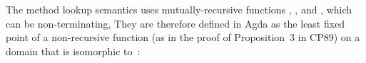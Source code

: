\begin{AgdaAlign}
The method lookup semantics uses mutually-recursive functions 
, , and ,
which can be non-terminating, 
They are therefore defined in Agda as the least fixed point
of a non-recursive function 
(as in the proof of Proposition~3 in CP89) on a domain 
that is isomorphic to~:
%
\begin{code}%
%
\>[2]\AgdaSpace{}%
\AgdaSymbol{=}%
\>[8]\AgdaSymbol{(}\AgdaSpace{}%
\AgdaSpace{}%
\AgdaSpace{}%
\AgdaSpace{}%
\AgdaSpace{}%
\AgdaSpace{}%
\AgdaSymbol{)}\AgdaSpace{}%
\<%
\\
%
\>[8]\AgdaSymbol{(}\AgdaSpace{}%
\AgdaSpace{}%
\AgdaSpace{}%
\AgdaSpace{}%
\AgdaSpace{}%
\AgdaSpace{}%
\AgdaSpace{}%
\AgdaSpace{}%
\AgdaSymbol{)}\AgdaSpace{}%
\<%
\\
%
\>[8]\AgdaSymbol{(}\AgdaSpace{}%
\AgdaSpace{}%
\AgdaSpace{}%
\AgdaSpace{}%
\AgdaSpace{}%
\AgdaSpace{}%
\AgdaSpace{}%
\AgdaSpace{}%
\AgdaSpace{}%
\AgdaSpace{}%
\AgdaSymbol{)}\<%
\\
%
\\[\AgdaEmptyExtraSkip]%
%
\>[2]\AgdaSpace{}%
\AgdaModule{\AgdaUnderscore{}}\<%
\\
\>[2][@{}l@{\AgdaIndent{0}}]%
\>[6]\AgdaSymbol{\{}\AgdaSpace{}%
\AgdaSpace{}%
\AgdaSymbol{:}\AgdaSpace{}%
\AgdaSpace{}%
\AgdaSymbol{\}}\<%
\\
%
\>[6]\AgdaSymbol{\{\{}\AgdaSpace{}%
\AgdaSpace{}%
\AgdaSymbol{:}\AgdaSpace{}%
\AgdaSpace{}%
\AgdaSpace{}%
\AgdaSpace{}%
\AgdaSpace{}%
\AgdaSpace{}%
\AgdaSymbol{\}\}}\<%
\\
\>[2][@{}l@{\AgdaIndent{0}}]%
\>[4]\<%
\\
%
\>[4]\AgdaSpace{}%
\AgdaSymbol{:}\AgdaSpace{}%
\AgdaSpace{}%
\AgdaSpace{}%
\<%
\\
%
\>[4]%

\end{code}
\end{AgdaAlign}
